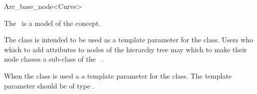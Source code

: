 
\ccRefPageBegin

\begin{ccRefClass}{Arr_base_node<Curve>}

\ccDefinition
    The \ccRefName\ is a model of the  concept.

    The class is intended to be used as a template parameter for the
     class. Users who
    which to add attributes to nodes of the hierarchy tree may which
    to make their node classes a sub-class of the \ccRefName\ .


    When the class is used a a template parameter for the
     class. The
    template parameter  should be of type
    .

\ccIsModel

\end{ccRefClass}
\ccRefPageEnd
